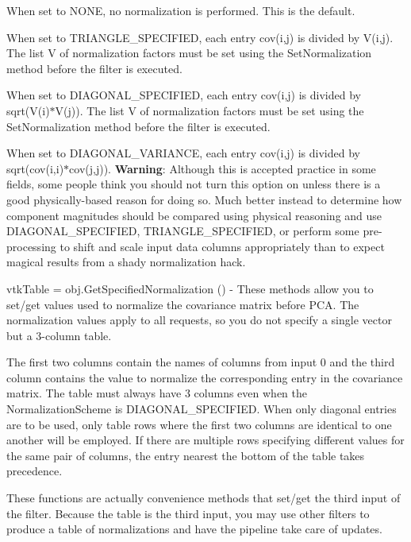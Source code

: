 \begin{DoxyItemize}
When set to N\-O\-N\-E, no normalization is performed. This is the default.

When set to T\-R\-I\-A\-N\-G\-L\-E\-\_\-\-S\-P\-E\-C\-I\-F\-I\-E\-D, each entry cov(i,j) is divided by V(i,j). The list V of normalization factors must be set using the Set\-Normalization method before the filter is executed.

When set to D\-I\-A\-G\-O\-N\-A\-L\-\_\-\-S\-P\-E\-C\-I\-F\-I\-E\-D, each entry cov(i,j) is divided by sqrt(V(i)$\ast$\-V(j)). The list V of normalization factors must be set using the Set\-Normalization method before the filter is executed.

When set to D\-I\-A\-G\-O\-N\-A\-L\-\_\-\-V\-A\-R\-I\-A\-N\-C\-E, each entry cov(i,j) is divided by sqrt(cov(i,i)$\ast$cov(j,j)). {\bfseries Warning}\-: Although this is accepted practice in some fields, some people think you should not turn this option on unless there is a good physically-\/based reason for doing so. Much better instead to determine how component magnitudes should be compared using physical reasoning and use D\-I\-A\-G\-O\-N\-A\-L\-\_\-\-S\-P\-E\-C\-I\-F\-I\-E\-D, T\-R\-I\-A\-N\-G\-L\-E\-\_\-\-S\-P\-E\-C\-I\-F\-I\-E\-D, or perform some pre-\/processing to shift and scale input data columns appropriately than to expect magical results from a shady normalization hack.  
\item {\ttfamily vtk\-Table = obj.\-Get\-Specified\-Normalization ()} -\/ These methods allow you to set/get values used to normalize the covariance matrix before P\-C\-A. The normalization values apply to all requests, so you do not specify a single vector but a 3-\/column table.

The first two columns contain the names of columns from input 0 and the third column contains the value to normalize the corresponding entry in the covariance matrix. The table must always have 3 columns even when the Normalization\-Scheme is D\-I\-A\-G\-O\-N\-A\-L\-\_\-\-S\-P\-E\-C\-I\-F\-I\-E\-D. When only diagonal entries are to be used, only table rows where the first two columns are identical to one another will be employed. If there are multiple rows specifying different values for the same pair of columns, the entry nearest the bottom of the table takes precedence.

These functions are actually convenience methods that set/get the third input of the filter. Because the table is the third input, you may use other filters to produce a table of normalizations and have the pipeline take care of updates.


\end{DoxyItemize}
